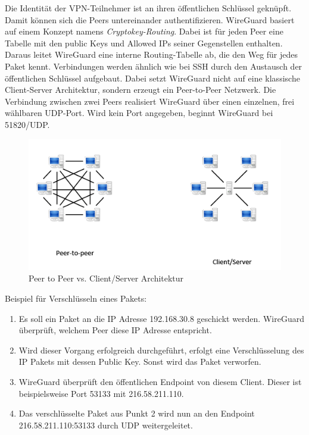 \newpage \noindent
Die Identität der VPN-Teilnehmer ist an ihren öffentlichen Schlüssel geknüpft. Damit können sich die Peers untereinander authentifizieren. WireGuard basiert auf einem Konzept namens \textit{Cryptokey-Routing}. Dabei ist für jeden Peer eine Tabelle mit den public Keys und Allowed IPs seiner Gegenstellen enthalten. Daraus leitet WireGuard eine interne Routing-Tabelle ab, die den Weg für jedes Paket kennt. Verbindungen werden ähnlich wie bei SSH durch den Austausch der öffentlichen Schlüssel aufgebaut. Dabei setzt WireGuard nicht auf eine klassische Client-Server Architektur, sondern erzeugt ein Peer-to-Peer Netzwerk. Die Verbindung zwischen zwei Peers realisiert WireGuard über einen einzelnen, frei wählbaren UDP-Port. Wird kein Port angegeben, beginnt WireGuard bei 51820/UDP.
\begin{figure}[H]
  \centering
  \includegraphics[scale=0.75]{images/peer2peer.png}
  \caption{Peer to Peer vs. Client/Server Architektur}
\end{figure} 
\noindent Beispiel für Verschlüsseln eines Pakets:
\begin{enumerate}
    \item Es soll ein Paket an die IP Adresse 192.168.30.8 geschickt werden. WireGuard überprüft, welchem Peer diese IP Adresse entspricht. 
    \item Wird dieser Vorgang erfolgreich durchgeführt, erfolgt eine Verschlüsselung des IP Pakets mit dessen Public Key. Sonst wird das Paket verworfen.
    \item WireGuard überprüft den öffentlichen Endpoint von diesem Client. Dieser ist beispielsweise Port 53133 mit 216.58.211.110.
    \item Das verschlüsselte Paket aus Punkt 2 wird nun an den Endpoint 216.58.211.110:53133 durch UDP weitergeleitet.\newline
\end{enumerate}
